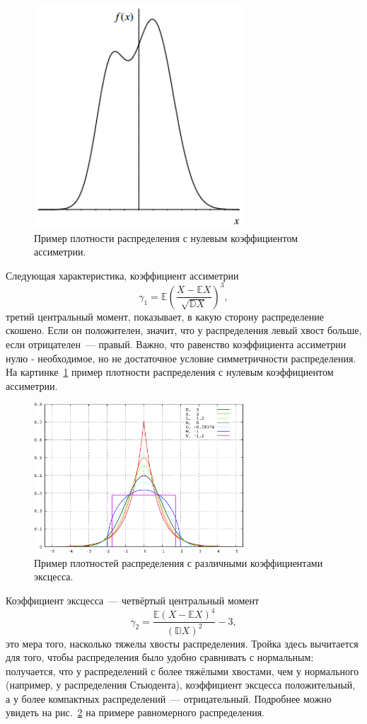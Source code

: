 \begin{figure}[!htb]\center
\includegraphics[width=0.7\textwidth]{lectures/lect1/src/Capture.png}
\caption{Пример плотности распределения с нулевым коэффициентом ассиметрии.}
\label{fg:lect1:fig-1}
\end{figure}
Следующая характеристика, коэффициент ассиметрии
\[
\gamma_1 = \mathbb{E} \left( \frac{X-\mathbb{E}X} {\sqrt{\mathbb{D}X}} \right)^3,
\]
третий центральный момент, показывает, в какую сторону распределение скошено. Если он положителен, значит, что у распределения левый хвост больше, если отрицателен~--- правый. Важно, что равенство коэффициента ассиметрии нулю - необходимое, но не достаточное условие симметричности распределения. На картинке~\ref{fg:lect1:fig-1} пример плотности распределения с нулевым коэффициентом ассиметрии.


\begin{figure}[!htb]\center
\includegraphics[width=0.7\textwidth]{lectures/lect1/src/kurtosis.png}
\caption{Пример плотностей распределения с различными коэффициентами эксцесса.}
\label{fg:lect1:fig-2}
\end{figure}
Коэффициент эксцесса~--- четвёртый центральный момент
\[
    \gamma_2 =  \frac{\mathbb{E}\left(X-\mathbb{E}X\right)^4}{\left(\mathbb{D}X\right)^2} - 3,
\]
это мера того, насколько тяжелы хвосты распределения. Тройка здесь вычитается для того, чтобы распределения было удобно сравнивать с нормальным: получается, что у распределений с более тяжёлыми хвостами, чем у нормального (например, у распределения Стьюдента), коэффициент эксцесса положительный, а у более компактных распределений~--- отрицательный. Подробнее можно увидеть на рис.~\ref{fg:lect1:fig-2} на примере равномерного распределения.


